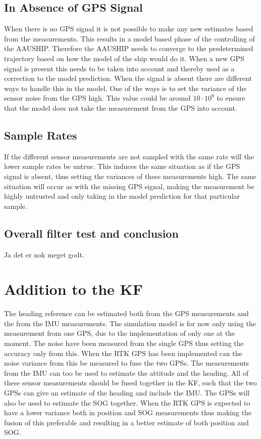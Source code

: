 \subsection{In Absence of \ac{GPS} Signal}
When there is no \ac{GPS} signal it is not possible to make any new estimates based from the measurements. This results in a model based phase of the controlling of the AAUSHIP. Therefore the AAUSHIP needs to converge to the predetermined trajectory based on how the model of the ship would do it. When a new \ac{GPS} signal is present this needs to be taken into account and thereby used as a correction to the model prediction. When the signal is absent there are different ways to handle this in the model. One of the ways is to set the variance of the sensor noise from the \ac{GPS} high. This value could be around $10 \cdot 10^9$ to ensure that the model does not take the measurement from the \ac{GPS} into account.

\subsection{Sample Rates}
If the different sensor measurements are not sampled with the same rate will the lower sample rates be untrue. This induces the same situation as if the \ac{GPS} signal is absent, thus setting the variances of these measurements high. The same situation will occur as with the missing \ac{GPS} signal, making the measurement be highly untrusted and only taking in the model prediction for that particular sample.

\subsection{Overall filter test and conclusion}
Ja det er nok meget godt.

\section{Addition to the \acl{KF}}
The heading reference can be estimated both from the \ac{GPS} measurements and the from the \ac{IMU} measurements. The simulation model is for now only using the measurement from one \ac{GPS}, due to the implementation of only one at the moment. The noise have been measured from the single \ac{GPS} thus setting the accuracy only from this. When the \ac{RTK} \ac{GPS} has been implemented can the noise variance from this be measured to fuse the two \ac{GPS}s. The measurements from the \ac{IMU} can too be used to estimate the attitude and the heading. All of these sensor measurements should be fused together in the \ac{KF}, such that the two \ac{GPS}s can give an estimate of the heading and include the \ac{IMU}. The \ac{GPS}s will also be used to estimate the \ac{SOG} together. When the \ac{RTK} \ac{GPS} is expected to have a lower variance both in position and \ac{SOG} measurements thus making the fusion of this preferable and resulting in a better estimate of both position and \ac{SOG}.



